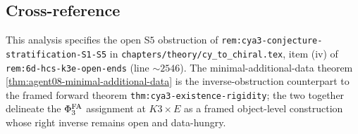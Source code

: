 \subsection{Cross-reference}
\label{wn:subsec:agent08-cross-ref}

This analysis specifies the open S$5$ obstruction of
\texttt{rem:cya3-conjecture-stratification-S1-S5} in
\texttt{chapters/theory/cy\_to\_chiral.tex}, item (iv) of
\texttt{rem:6d-hcs-k3e-open-ends} \textup{(}line $\sim 2546$\textup{).}
The minimal-additional-data theorem
\ref{thm:agent08-minimal-additional-data} is the inverse-obstruction
counterpart to the framed forward theorem
\texttt{thm:cya3-existence-rigidity}; the two together delineate the
$\Phi^{\mathrm{FA}}_3$ assignment at $K3\times E$ as a framed object-level
construction whose right inverse remains open and data-hungry.

